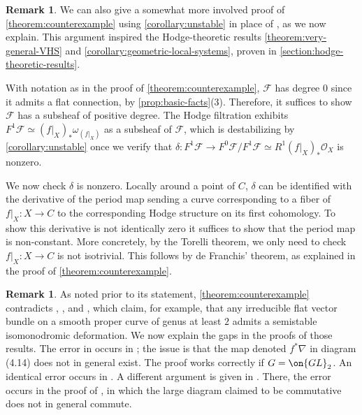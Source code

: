 \documentclass[12 pt]{amsart}
\theoremstyle{plain}
\theoremstyle{definition}
\newtheorem{remark}[subsubsection]{Remark}
\theoremstyle{remark}
\numberwithin{equation}{section}
\begin{document}
\begin{remark}
	\label{remark:alternate-hodge-proof}
	We can also give a somewhat more involved proof of
	\autoref{theorem:counterexample} using \autoref{corollary:unstable} in
	place of \cite[Theorem
	4]{cataneseD:answer-to-a-question-by-fujita}, as we now explain. This argument inspired the Hodge-theoretic results \autoref{theorem:very-general-VHS} and \autoref{corollary:geometric-local-systems}, proven in \autoref{section:hodge-theoretic-results}.

	With notation as in the proof of 
	\autoref{theorem:counterexample},
	$\mathscr{F}$ has degree $0$ since it admits a flat connection, by
	\autoref{prop:basic-facts}(3).
	Therefore, it suffices to show $\mathscr{F}$ has a subsheaf of positive
degree.
The Hodge filtration exhibits $F^1\mathscr F\simeq (f|_X)_* \omega_{(f|_X)}$ as a subsheaf
of $\mathscr F$,
which is destabilizing by
\autoref{corollary:unstable}
once we verify that
$\delta: F^1\mathscr F \to F^0 \mathscr F/ F^1 \mathscr F \simeq R^1 (f|_X)_* \mathscr{O}_{X}$
is nonzero.

We now check $\delta$ is nonzero.
Locally around a point of $C$, $\delta$ 
can be identified with the derivative of the period map
\cite[Theorem 5.3.4]{carlsonMP:period-mappings}
sending a curve corresponding to a fiber of 
$f|_X : X \to C$
to the corresponding Hodge structure on its first cohomology. To show this derivative is not identically zero it suffices to show that the period map is non-constant.
More concretely, by the Torelli theorem, we only need to check
$f|_X: X \to C$ is not isotrivial.
This follows by de Franchis' theorem, as explained in the proof of
\autoref{theorem:counterexample}.
\end{remark}

\begin{remark}
	\label{remark:bhh-error}
	As noted prior to its statement,
	\autoref{theorem:counterexample} contradicts
\cite[Theorem 1.3]{BHH:logarithmic},
\cite[Theorem 1.3]{BHH:irregular}, and
\cite[Theorem 1.2]{BHH:parabolic}, which claim, for example, that any irreducible flat vector bundle on a smooth proper  curve of genus at least $2$ admits a semistable isomonodromic deformation. We now explain the gaps in the proofs of
those results. The error in \cite[Theorem 1.3]{BHH:logarithmic} occurs in
\cite[Proposition 4.3]{BHH:logarithmic}; the issue is that the map denoted
$f^*\nabla$ in diagram (4.14) does not in general exist. The proof works
correctly if $G=\on{GL}_2$. An identical error occurs in \cite[Proposition
4.4]{BHH:irregular}. A different argument is given in \cite{BHH:parabolic}.
There, the error occurs in the proof of \cite[Proposition 5.1]{BHH:parabolic}, 
in which the large diagram claimed to be commutative does not in general commute.
\end{remark}
\end{document}
